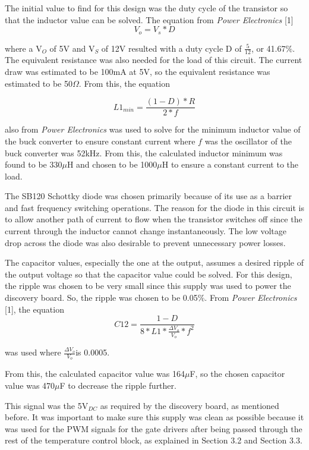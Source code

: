 \documentclass[11pt,letter]{article}
\begin{document}
The initial value to find for this design was the duty cycle of the transistor so that the inductor value can be solved. The equation from \textit{Power Electronics} [1]
\begin{equation}
    V_o = V_s*D
\end{equation}

where a V$_O$ of 5V and V$_S$ of 12V resulted with a duty cycle D of $\frac{5}{12}$, or 41.67$\%$. The equivalent resistance was also needed for the load of this circuit. The current draw was estimated to be 100mA at 5V, so the equivalent resistance was estimated to be 50$\Omega$. From this, the equation

\begin{equation}
    L1_{min} = \frac{(1-D)*R}{2*f}
\end{equation}

also from \textit{Power Electronics} was used to solve for the minimum inductor value of the buck converter to ensure constant current where $f$ was the oscillator of the buck converter was 52kHz. From this, the calculated inductor minimum was found to be 330$\mu$H and chosen to be 1000$\mu$H to ensure a constant current to the load.

The SB120 Schottky diode was chosen primarily because of its use as a barrier and fast frequency switching operations. The reason for the diode in this circuit is to allow another path of current to flow when the transistor switches off since the current through the inductor cannot change instantaneously. The low voltage drop across the diode was also desirable to prevent unnecessary power losses.

The capacitor values, especially the one at the output, assumes a desired ripple of the output voltage so that the capacitor value could be solved. For this design, the ripple was chosen to be very small since this supply was used to power the discovery board. So, the ripple was chosen to be 0.05$\%$. From \textit{Power Electronics} [1], the equation
\begin{equation}
    C12 = \frac{1-D}{8*L1*\frac{\Delta V_o}{V_o}*f^2}
\end{equation}

was used where $\frac{\Delta V_o}{V_o}$is 0.0005. 

From this, the calculated capacitor value was 164$\mu$F, so the chosen capacitor value was 470$\mu$F to decrease the ripple further.

This signal was the 5V$_{DC}$ as required by the discovery board, as mentioned before. It was important to make sure this supply was clean as possible because it was used for the PWM signals for the gate drivers after being passed through the rest of the temperature control block, as explained in Section 3.2 and Section 3.3. 
\end{document}
